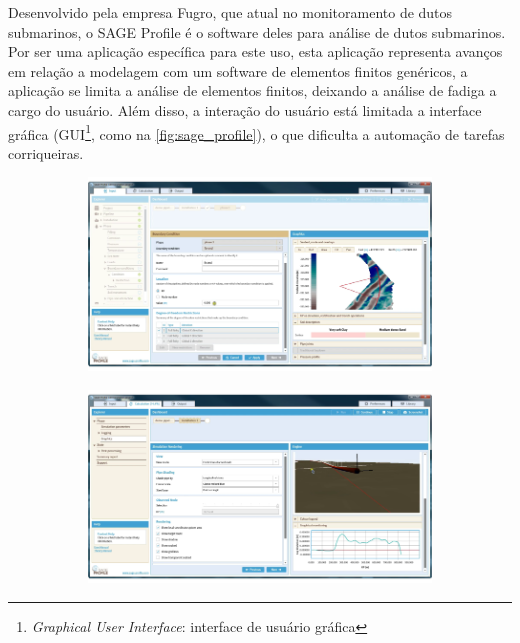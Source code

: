 Desenvolvido pela empresa Fugro, que atual no monitoramento de dutos submarinos, o SAGE Profile \cite{Sage} é o software deles para análise de dutos submarinos. Por ser uma aplicação específica para este uso, esta aplicação representa avanços em relação a modelagem com um software de elementos finitos genéricos, a aplicação se limita a análise de elementos finitos, deixando a análise de fadiga a cargo do usuário. Além disso, a interação do usuário está limitada a interface gráfica (GUI\footnote{\textit{Graphical User Interface}: interface de usuário gráfica}, como na \autoref{fig:sage_profile}), o que dificulta a automação de tarefas corriqueiras.

\begin{figure}[!ht]
    \centering
    \caption{Interface gráfica do SAGE Profile.}\label{fig:sage_profile}
    \begin{subfigure}[t]{0.49\textwidth}
        \centering
        \includegraphics[width=\textwidth]{imagens/sage_profile_1}
    \end{subfigure}
    \hfill
    \begin{subfigure}[t]{0.49\textwidth}
        \centering
        \includegraphics[width=\textwidth]{imagens/sage_profile_2}
    \end{subfigure}
\end{figure}


